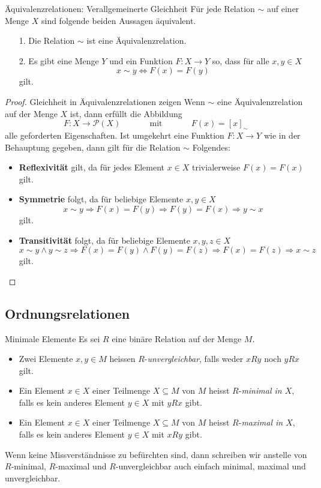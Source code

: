     \begin{lemma}{Äquivalenzrelationen: Verallgemeinerte Gleichheit}
    Für jede Relation $\sim$ auf einer Menge $X$ sind folgende beiden Aussagen äquivalent.
    \begin{enumerate}
    \item[1.] Die Relation $\sim$ ist eine Äquivalenzrelation.
    \item[2.] Es gibt eine Menge $Y$ und ein Funktion $F:X\to Y$ so, dass für alle $x,y\in X$
    \[
    x\sim y\Leftrightarrow F(x)=F(y)
    \]
    gilt.
    \end{enumerate}
    \end{lemma}
    
    \begin{proof}{Gleichheit in Äquivalenzrelationen zeigen}
    Wenn $\sim$ eine Äquivalenzrelation auf der Menge $X$ ist, dann erfüllt die Abbildung
    \[
    F:X\to\mathcal{P}(X)\phantom{abstand}\text{mit} \phantom{abstand} F(x)=[x]_\sim
    \]
    alle geforderten Eigenschaften. Ist umgekehrt eine Funktion $F:X\to Y$ wie in der Behauptung gegeben, dann gilt für die Relation $\sim$ Folgendes:
    \begin{itemize}
    \item\textbf{Reflexivität} gilt, da für jedes Element $x\in X$ trivialerweise $F(x)=F(x)$ gilt.
    \item \textbf{Symmetrie} folgt, da für beliebige Elemente $x,y\in X$
    \[
    x\sim y\Rightarrow F(x)=F(y)\Rightarrow F(y)=F(x)\Rightarrow y\sim x
    \]
    gilt.
    \item\textbf{Transitivität} folgt, da für beliebige Elemente $x,y,z\in X$
    \[
    x\sim y\land y\sim z\Rightarrow F(x)=F(y)\land F(y)=F(z)\Rightarrow F(x)=F(z)\Rightarrow  x\sim z
    \]
    gilt.
    \end{itemize}
    \end{proof}


    \subsection*{Ordnungsrelationen}

    \begin{definition}{Minimale Elemente}
    Es sei $R$ eine binäre Relation auf der Menge $M$.
    \begin{itemize}
    \item Zwei Elemente $x,y\in M$ heissen $R$-\textit{unvergleichbar}, falls weder $xRy$ noch $yRx$ gilt.
    \item Ein Element $x\in X$ einer Teilmenge $X\subseteq M$ von $M$ heisst $R$-\textit{minimal in $X$}, falls es kein anderes Element $y\in X$ mit $yRx$ gibt.
    \item  Ein Element $x\in X$ einer Teilmenge $X\subseteq M$ von $M$ heisst $R$-\textit{maximal in $X$}, falls es kein anderes Element $y\in X$ mit $xRy$ gibt.
    \end{itemize}
    Wenn keine Missverständnisse zu befürchten sind, dann schreiben wir anstelle von $R$-minimal, $R$-maximal und $R$-unvergleichbar auch einfach minimal, maximal und unvergleichbar.
    \end{definition}


